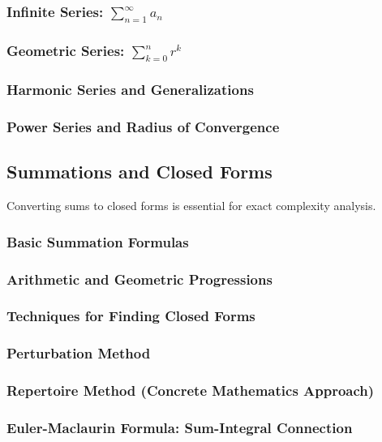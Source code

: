 \subsubsection{Infinite Series: $\sum_{n=1}^{\infty} a_n$}
\subsubsection{Geometric Series: $\sum_{k=0}^{n} r^k$}
\subsubsection{Harmonic Series and Generalizations}
\subsubsection{Power Series and Radius of Convergence}
\subsection{Summations and Closed Forms}
\label{subsec:summations}

\begin{subsectionintro}
Converting sums to closed forms is essential for exact complexity analysis.
\end{subsectionintro}

\subsubsection{Basic Summation Formulas}
\subsubsection{Arithmetic and Geometric Progressions}
\subsubsection{Techniques for Finding Closed Forms}
\subsubsection{Perturbation Method}
\subsubsection{Repertoire Method (Concrete Mathematics Approach)}
\subsubsection{Euler-Maclaurin Formula: Sum-Integral Connection}


